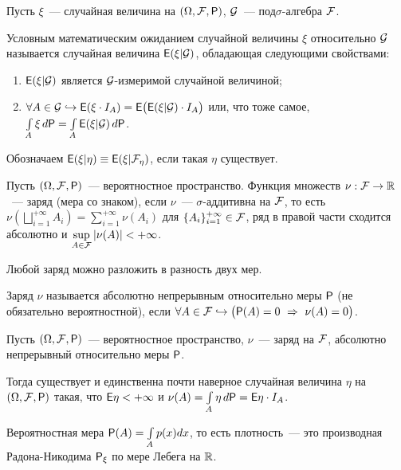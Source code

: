\begin{definition}
	Пусть $\xi$~--- случайная величина на $(\Omega, \F, \P)$, $\G$~--- под$\sigma$-алгебра $\F$. 
	
	Условным математическим ожиданием случайной величины $\xi$ относительно $\G$ называется случайная величина $\E (\xi | \G)$, обладающая следующими свойствами:
	\begin{enumerate}
		\item $\E(\xi | \G )$ является $\G$-измеримой случайной величиной;
		\item $\forall A \in \G \hookrightarrow \E ( \xi \cdot I_A) = \E \big( \E (\xi | \G )\cdot I_A \big)$ или, что тоже самое, $\int\limits_A \xi \, d \P = \int\limits_A \E (\xi | \G )\,d \P$.
	\end{enumerate}
	Обозначаем $\E (\xi | \eta ) \equiv \E (\xi | \F_\eta )$, если такая $\eta$ существует.
\end{definition}
\begin{definition}
	Пусть $(\Omega, \F, \P)$~--- вероятностное пространство. Функция множеств $\nu: \F \rightarrow \R$~--- заряд (мера со знаком), если $\nu$~--- $\sigma$-аддитивна на $\F$, то есть $\nu \left( \bigsqcup\limits_{i=1}^{+\infty} A_i \right) = \sum\limits_{i=1}^{+\infty} \nu (A_i)$ для $\{ A_i \}_{i=1}^{+\infty} \in \F$, ряд в правой части сходится абсолютно и  $\sup\limits_{A \in \F} | \nu(A) | < + \infty$.
	
	Любой заряд можно разложить в разность двух мер.
\end{definition}

\begin{definition}
	Заряд $\nu$ называется абсолютно непрерывным относительно меры $\P$ (не обязательно вероятностной), если $\forall A \in \F \hookrightarrow \big(\P (A) = 0~\Rightarrow~\nu (A) = 0\big)$.
\end{definition}

\begin{theorem}
	Пусть $(\Omega, \F, \P)$~--- вероятностное пространство, $\nu$~--- заряд на $\F$, абсолютно непрерывный относительно меры $\P$. 
	
	Тогда существует и единственна почти наверное случайная величина $\eta$ на $(\Omega, \F, \P)$ такая, что $\E \eta < +\infty$ и $\nu(A) = \int\limits_A \eta \, d \P = \E \eta \cdot I_A$.
\end{theorem}

\begin{statement}
    Вероятностная мера $\P(A) = \int\limits_A p(x)dx$, то есть плотность~--- это производная Радона-Никодима $\P_{\xi}$ по мере Лебега на $\R$.
\end{statement}